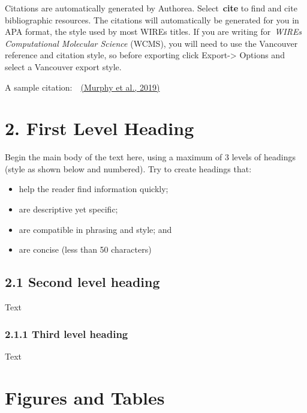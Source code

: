 \documentclass[10pt]{article}
\providecommand{\tightlist}{\setlength{\itemsep}{0pt}\setlength{\parskip}{0pt}}%
\begin{document}
Citations are automatically generated by Authorea. Select~\textbf{cite}
to find and cite bibliographic resources. The citations will
automatically be generated for you in APA format, the style used by most
WIREs titles. If you are writing for~\emph{WIREs Computational Molecular
Science} (WCMS), you will need to use the Vancouver reference and
citation style, so before exporting click Export-\textgreater{} Options
and select a Vancouver export style.

A sample citation:~~\hyperref[csl:1]{(Murphy et al., 2019)}

\section*{2. First Level Heading}

{\label{350277}}

Begin the main body of the text here, using a maximum of 3 levels of
headings (style as shown below and numbered). Try to create headings
that:

\begin{itemize}
\tightlist
\item
  help the reader find information quickly;~
\item
  are descriptive yet specific;
\item
  are compatible in phrasing and style; and~
\item
  are concise (less than 50 characters)
\end{itemize}

\subsection*{2.1 Second level heading}

{\label{733281}}

Text

\subsubsection*{2.1.1 Third level heading}

{\label{824595}}

Text

\par\null

\section*{Figures and Tables}

{\label{432859}}
\end{document}
